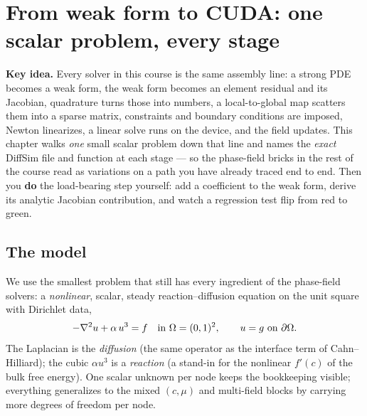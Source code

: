 \chapter{From weak form to CUDA: one scalar problem, every stage}
\label{ch:c0}

\begin{keybox}
\textbf{Key idea.} Every solver in this course is the same assembly line:
a strong PDE becomes a weak form, the weak form becomes an element
residual and its Jacobian, quadrature turns those into numbers, a
local-to-global map scatters them into a sparse matrix, constraints and
boundary conditions are imposed, Newton linearizes, a linear solve runs
on the device, and the field updates. This chapter walks \emph{one} small
scalar problem down that line and names the \emph{exact} DiffSim file and
function at each stage --- so the phase-field bricks in the rest of the
course read as variations on a path you have already traced end to end.
Then you \textbf{do} the load-bearing step yourself: add a coefficient to
the weak form, derive its analytic Jacobian contribution, and watch a
regression test flip from red to green.
\end{keybox}

\section{The model}

We use the smallest problem that still has every ingredient of the
phase-field solvers: a \emph{nonlinear}, scalar, steady reaction--diffusion
equation on the unit square with Dirichlet data,
%
\begin{equation}
  -\nabla^2 u + \alpha\,u^3 = f \quad\text{in } \Omega=(0,1)^2,
  \qquad u = g \ \text{on } \partial\Omega .
  \label{eq:c0strong}
\end{equation}
%
The Laplacian is the \emph{diffusion} (the same operator as the interface
term of Cahn--Hilliard); the cubic $\alpha u^3$ is a \emph{reaction} (a
stand-in for the nonlinear $f'(c)$ of the bulk free energy). One scalar
unknown per node keeps the bookkeeping visible; everything generalizes to
the mixed $(c,\mu)$ and multi-field blocks by carrying more degrees of
freedom per node.

